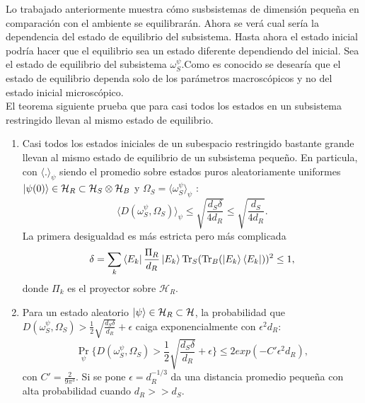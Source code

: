 Lo trabajado anteriormente muestra cómo susbsistemas de dimensión pequeña en comparación con el ambiente se equilibrarán. Ahora se verá cual sería la dependencia del estado de equilibrio del subsistema. Hasta ahora el estado inicial podría hacer que el equilibrio sea un estado diferente dependiendo del inicial. Sea el estado de equilibrio del subsistema $\omega_{S}^{\psi}$.Como es conocido se desearía que el estado de equilibrio dependa solo de los parámetros macroscópicos y no del estado inicial microscópico.
\\
El teorema siguiente prueba que para casi todos los estados en un subsistema restringido llevan al mismo estado de equilibrio.
\begin{theorem} \label{mismo estado}
\begin{enumerate}
\item Casi todos los estados iniciales de un subespacio restringido bastante grande llevan al mismo estado de equilibrio de un subsistema pequeño. En particula, con $\langle .\rangle_{\psi}$ siendo el promedio sobre estados puros aleatoriamente uniformes $\ket{\psi(0)} \in \mathcal{H}_{R} \subset \mathcal{H}_{S} \otimes \mathcal{H}_{B}$ y $\Omega_{S}= \langle \omega_{S}^{\psi} \rangle_{\psi}$ :
\begin{equation}
\langle D(\omega_{S}^{\psi}, \Omega_{S}) \rangle_{\psi} \leq \sqrt{\frac{d_{S} \delta}{4d_{R}}} \leq \sqrt{\frac{d_{S}}{4d_{R}}}.
\end{equation}
La primera desigualdad es más estricta pero más complicada 
\begin{equation}
\delta= \sum_{k}\bra{E_{k}}\frac{\Pi_{R}}{d_{R}}\ket{E_{k}} \Tr_{S} ( \Tr_{B} (\ket{E_{k}} \bra{E_{k}}) )^{2} \leq  1,
\end{equation}
donde $\Pi_{k}$ es el proyector sobre $\mathcal{H}_{R}$.
\item Para un estado aleatorio $\ket{\psi} \in \mathcal{H}_{R}\subset \mathcal{H}$, la probabilidad que $D(\omega_{S}^{\psi},\Omega_{S}) > \frac{1}{2} \sqrt{\frac{d_{S} \delta}{d_{R}}}+ \epsilon$ caiga exponencialmente con $\epsilon^{2}d_{R}$:
\begin{equation}
\Pr_{\psi} \bigg \{ D(\omega_{S}^{\psi}, \Omega_{S}) > \frac{1}{2}\sqrt{\frac{d_{S} \delta}{d_{R}}} + \epsilon \bigg \} \leq 2exp(-C'\epsilon^{2}d_{R}),
\end{equation}
con $C'=\frac{2}{9 \pi^{3}}$. Si se pone $\epsilon=d_{R}^{-1/3}$ da una distancia promedio pequeña con alta probabilidad cuando $d_{R}>>d_{S}$.
\end{enumerate}
\end{theorem}
